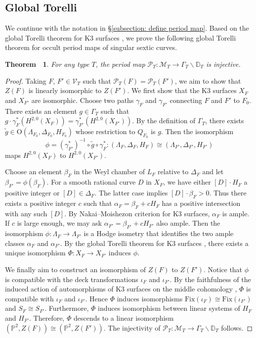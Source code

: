 \documentclass[12pt,reqno,a4paper]{amsart}
\newtheorem{thm}{Theorem~}[section]
\theoremstyle{remark}
\theoremstyle{definition}
\begin{document}
\subsection{Global Torelli}
We continue with the notation in \S\ref{subsection: define period map}. Based on the global Torelli theorem for K3 surfaces \cite{burns1975torelli}, we prove the following global Torelli theorem for occult period maps of singular sextic curves.
\begin{thm}
\label{theorem: global torelli}
For any type $T$, the period map $\mathscr{P}_T\colon \mathcal{M}_T \to \Gamma_{T}\backslash \mathbb{D}_T$ is injective.
\end{thm}
\begin{proof}
 Taking $F$, $F'\in \mathcal{V}_T$ such that $\mathscr{P}_T(F)=\mathscr{P}_T(F')$, we aim to show that $Z(F)$ is linearly isomorphic to $Z(F')$. We first show that the K3 surfaces $X_F$ and $X_{F'}$ are isomorphic.
Choose two paths $\gamma_F$ and $\gamma_{F'}$ connecting $F$ and $F'$ to $F_0$.
There exists an element $g\in \Gamma_{T}$ such that $g\cdot\gamma_F^*(H^{2,0}(X_F))=\gamma_{F'}^*(H^{2,0}(X_{F'}))$.
By the definition of $\Gamma_{T}$, there exists $\widetilde{g}\in \mathrm{O}(\Lambda_{F_0}, \Delta_{F_0},H_{F_0})$ whose restriction to $Q_{F_0}$ is $g$.
Then the isomorphism 
\[
\phi=(\gamma_{F'}^*)^{-1}\circ \widetilde{g}\circ \gamma_F^* \colon (\Lambda_F, \Delta_F, H_F)\cong (\Lambda_{F'}, \Delta_{F'}, H_{F'})
\]  
maps $H^{2,0}(X_F)$ to $H^{2,0}(X_{F'})$.

Choose an element $\beta_F$ in the Weyl chamber of $L_F$ relative to $\Delta_F$ and let $\beta_{F'}=\phi(\beta_F)$. For a smooth rational curve $D$ in $X_F$, we have either $[D]\cdot H_F$ a positive integer or $[D]\in \Delta_F$. The latter case implies $[D]\cdot \beta_F>0$. Thus there exists a positive integer $c$ such that $\alpha_F=\beta_F+cH_F$ has a positive intersection with any such $[D]$. By Nakai--Moishezon criterion for K3 surfaces, $\alpha_F$ is ample. If $c$ is large enough, we may ask $\alpha_{F'}=\beta_{F'}+cH_{F'}$ also ample. 
Then the isomorphism $\phi\colon \Lambda_F\to \Lambda_{F'}$ is a Hodge isometry that identifies the two ample classes $\alpha_F$ and $\alpha_{F'}$. By the global Torelli theorem for K3 surfaces \cite{burns1975torelli}, there exists a unique isomorphism $\Phi\colon X_F\to X_{F'}$ induces $\phi$. 

We finally aim to construct an isomorphism of $Z(F)$ to $Z(F')$.
Notice that $\phi$ is compatible with the deck transformations $\iota_F$ and $\iota_{F'}$. By the faithfulness of the induced action of automorphisms of K3 surfaces on the middle cohomology \cite{looijenga1980torelli}, $\Phi$ is compatible with $\iota_F$ and $\iota_{F'}$.
Hence $\Phi$ induces isomorphisms $\mathrm{Fix}(\iota_F)\cong \mathrm{Fix}(\iota_{F'})$ and $S_F\cong S_{F'}$. Furthermore, $\Phi$ induces isomorphism between linear systems of $H_F$ and $H_{F'}$. Therefore, $\Phi$ descends to a linear isomorphism $(\mathbb{P}^2, Z(F))\cong (\mathbb{P}^2, Z(F'))$. The injectivity of $\mathscr{P}_T\colon\mathcal{M}_T\to \Gamma_T\backslash \mathbb{D}_T$ follows.
\end{proof}
\end{document}
